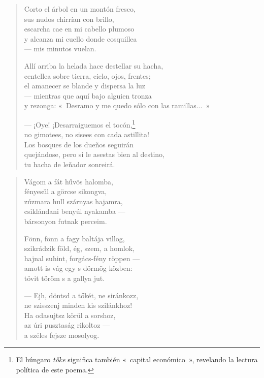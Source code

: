 \documentclass[11pt]{book}
\newcommand*{\centeredornament}{\centerline{\pgfornament[width=6cm]{88}}}
\begin{document}
\newpage

\vspace*{-15mm}
\centeredornament



\begin{verse}
  Corto el árbol en un montón fresco, \\
  sus nudos chirrían con brillo, \\
  escarcha cae en mi cabello plumoso \\
  y alcanza mi cuello donde cosquillea \\
  --- mis minutos vuelan.

  Allí arriba la helada hace destellar su hacha, \\
  centellea sobre tierra, cielo, ojos, frentes; \\
  el amanecer se blande y dispersa la luz \\
  --- mientras que aquí bajo alguien tronza \\
  y rezonga: «~Desramo y me quedo sólo con las ramillas...~»

  --- ¡Oye! ¡Desarraiguemos el tocón,\footnote{El húngaro \emph{tőke}
  significa también «~capital económico~», revelando la lectura
  política de este poema.} \\
  no gimotees, no sisees con cada astillita! \\
  Los bosques de los dueños seguirán \\
  quejándose, pero si le asestas bien al destino, \\
  tu hacha de leñador sonreirá.
\end{verse}

\newpage

\vspace*{-15mm}
\centeredornament



\begin{verse}
  Vágom a fát hűvös halomba, \\
  fényesül a görcse sikongva, \\
  zúzmara hull szárnyas hajamra, \\
  csiklándani benyúl nyakamba --- \\
  bársonyon futnak perceim.

  Fönn, fönn a fagy baltája villog, \\
  szikrádzik föld, ég, szem, a homlok, \\
  hajnal suhint, forgács-fény röppen --- \\
  amott is vág egy s dörmög közben: \\
  tövit töröm s a gallya jut.

  --- Ejh, döntsd a tőkét, ne siránkozz, \\
  ne szisszenj minden kis szilánkhoz! \\
  Ha odasujtsz körül a sorshoz, \\
  az úri pusztaság rikoltoz --- \\
  a széles fejsze mosolyog.
\end{verse}
\end{document}
